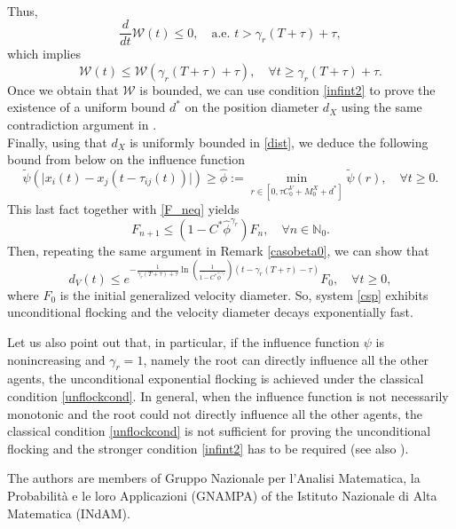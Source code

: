 \documentclass[11pt]{article}
\begin{document}
\begin{oss}[Case $\beta=0$]
$$\begin{array}{l}
      \end{array}$$
		Thus, \begin{equation}\label{negder}
        \frac{d}{dt}\mathcal{W}(t)\leq0,\quad \text{a.e. }t>\gamma_r(T+\tau)+\tau,
		\end{equation}
	which implies \begin{equation}\label{2tau1}
		\mathcal{W}(t)\leq \mathcal{W}(\gamma_r(T+\tau)+\tau),\quad \forall t\geq \gamma_r(T+\tau)+\tau.
		\end{equation}          
            Once we obtain that $\mathcal{W}$ is bounded, we can use condition \eqref{infint2} to prove the existence of a uniform bound $d^*$ on the position diameter $d_X$ using the same contradiction argument in \cite{CCP}.
            \\Finally, using that $d_X$ is uniformly bounded in \eqref{dist}, we deduce the following bound from below on the influence function
            $$\tilde\psi(\lvert x_i(t)-x_j(t-\tau_{ij}(t))\rvert)\geq \hat{\phi}:=\min_{r\in [0,\tau C_0^V+M_0^X+d^*]}\tilde\psi(r),\quad \forall t \geq 0.$$
            This last fact together with \eqref{F_neq} yields
            $$F_{n+1}\leq (1-C^*\hat{\phi}^{\gamma_r})F_n,\quad \forall n\in \mathbb{N}_0.$$
            Then, repeating the same argument in Remark \ref{casobeta0}, we can show that
            $$d_V(t)\leq  e^{-\frac{1}{\gamma_r(T+\tau)+\tau}\ln\left(\frac{1}{1-C^*\hat{\phi}^{\gamma_r}}\right)(t-\gamma_r(T+\tau)-\tau)}F_0,\quad \forall t\geq 0,$$
            where $F_0$ is the initial generalized velocity diameter. So, system \eqref{csp} exhibits unconditional flocking and the velocity diameter decays exponentially fast.  

\vspace{0.1cm}
            
            Let us also point out that, in particular, if the influence function $\psi$ is nonincreasing and $\gamma_r=1$, namely the root can directly influence all the other agents, the unconditional exponential flocking is achieved under the classical condition \eqref{unflockcond}. In general, when the influence function is not necessarily monotonic and the root could not directly influence all the other agents, the classical condition \eqref{unflockcond} is not sufficient for proving the unconditional flocking and the stronger condition \eqref{infint2} has to be required (see also \cite{CCP, Cont}).
	\end{oss}
     {\small The authors are members of Gruppo Nazionale per l’Analisi Matematica,
    	la Probabilità e le loro Applicazioni (GNAMPA) of the Istituto Nazionale di
    	Alta Matematica (INdAM). }
  
\end{document}

